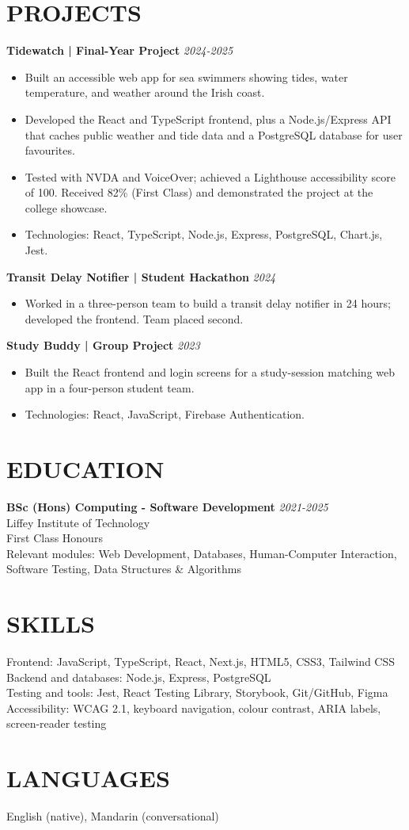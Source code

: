 \documentclass[11pt,a4paper]{article}
\begin{document}
\section*{PROJECTS}
\textbf{Tidewatch | Final-Year Project} \hfill \textit{2024-2025}
\begin{itemize}
\item Built an accessible web app for sea swimmers showing tides, water temperature, and weather around the Irish coast.
\item Developed the React and TypeScript frontend, plus a Node.js/Express API that caches public weather and tide data and a PostgreSQL database for user favourites.
\item Tested with NVDA and VoiceOver; achieved a Lighthouse accessibility score of 100. Received 82\% (First Class) and demonstrated the project at the college showcase.
\item Technologies: React, TypeScript, Node.js, Express, PostgreSQL, Chart.js, Jest.
\end{itemize}
\textbf{Transit Delay Notifier | Student Hackathon} \hfill \textit{2024}
\begin{itemize}
\item Worked in a three-person team to build a transit delay notifier in 24 hours; developed the frontend. Team placed second.
\end{itemize}
\textbf{Study Buddy | Group Project} \hfill \textit{2023}
\begin{itemize}
\item Built the React frontend and login screens for a study-session matching web app in a four-person student team.
\item Technologies: React, JavaScript, Firebase Authentication.
\end{itemize}
\section*{EDUCATION}
\textbf{BSc (Hons) Computing - Software Development} \hfill \textit{2021-2025}\\
Liffey Institute of Technology\\
First Class Honours\\
Relevant modules: Web Development, Databases, Human-Computer Interaction, Software Testing, Data Structures \& Algorithms
\section*{SKILLS}
Frontend: JavaScript, TypeScript, React, Next.js, HTML5, CSS3, Tailwind CSS\\
Backend and databases: Node.js, Express, PostgreSQL\\
Testing and tools: Jest, React Testing Library, Storybook, Git/GitHub, Figma\\
Accessibility: WCAG 2.1, keyboard navigation, colour contrast, ARIA labels, screen-reader testing
\section*{LANGUAGES}
English (native), Mandarin (conversational)
\end{document}
